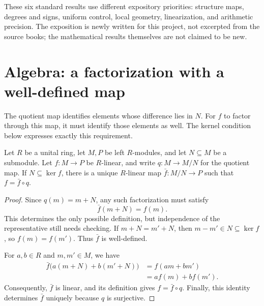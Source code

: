 \documentclass[11pt,a4paper]{article}
\begin{document}

These six standard results use different expository priorities: structure maps, degrees and signs, uniform control, local geometry, linearization, and arithmetic precision. The exposition is newly written for this project, not excerpted from the source books; the mathematical results themselves are not claimed to be new.

\medskip

\section{Algebra: a factorization with a well-defined map}

The quotient map identifies elements whose difference lies in $N$. For $f$ to factor through this map, it must identify those elements as well. The kernel condition below expresses exactly this requirement.

\begin{proposition}\label{thm:quotient-factorization}

Let $R$ be a unital ring, let $M,P$ be left $R$-modules, and let $N\subseteq M$ be a submodule. Let $f\colon M\to P$ be $R$-linear, and write $q\colon M\to M/N$ for the quotient map. If $N\subseteq\ker f$, there is a unique $R$-linear map $\bar f\colon M/N\to P$ such that $f=\bar f\circ q$.

\end{proposition}

\begin{proof}

Since $q(m)=m+N$, any such factorization must satisfy
\[
\bar f(m+N)=f(m).
\]
This determines the only possible definition, but independence of the representative still needs checking. If $m+N=m'+N$, then $m-m'\in N\subseteq\ker f$, so $f(m)=f(m')$. Thus $\bar f$ is well-defined.

For $a,b\in R$ and $m,m'\in M$, we have
\[
\begin{aligned}
\bar f\bigl(a(m+N)+b(m'+N)\bigr)
 &=f(am+bm')\\
 &=a f(m)+b f(m').
\end{aligned}
\]
Consequently, $\bar f$ is linear, and its definition gives $f=\bar f\circ q$. Finally, this identity determines $\bar f$ uniquely because $q$ is surjective.
\end{proof}
\end{document}
